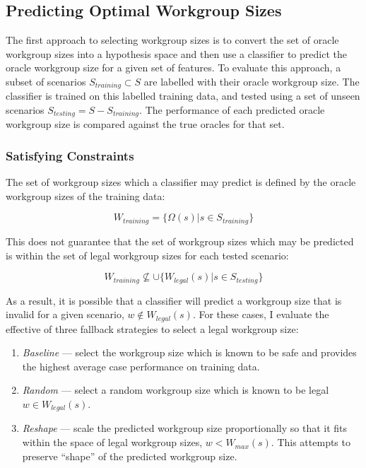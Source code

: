 \subsection{Predicting Optimal Workgroup Sizes}

The first approach to selecting workgroup sizes is to convert the set
of oracle workgroup sizes into a hypothesis space and then use a
classifier to predict the oracle workgroup size for a given set of
features. To evaluate this approach, a subset of scenarios
$S_{training} \subset S$ are labelled with their oracle workgroup
size. The classifier is trained on this labelled training data, and
tested using a set of unseen scenarios
$S_{testing} = S - S_{training}$. The performance of each predicted
oracle workgroup size is compared against the true oracles for that
set.


\subsubsection{Satisfying Constraints}

The set of workgroup sizes which a classifier may predict is defined
by the oracle workgroup sizes of the training data:

\begin{equation}
W_{training} = \{ \Omega(s) | s \in S_{training} \}
\end{equation}

This does not guarantee that the set of workgroup sizes which may be
predicted is within the set of legal workgroup sizes for each tested
scenario:

\begin{equation}
W_{training} \nsubseteq \cup \{ W_{legal}(s) | s \in S_{testing} \}
\end{equation}


As a result, it is possible that a classifier will predict a workgroup
size that is invalid for a given scenario, $w \not\in W_{legal}(s)$.
For these cases, I evaluate the effective of three fallback strategies
to select a legal workgroup size:

\begin{enumerate}
\item \emph{Baseline} --- select the workgroup size which is known to
  be safe and provides the highest average case performance on
  training data.
\item \emph{Random} --- select a random workgroup size which is known
  to be legal $w \in W_{legal}(s)$.
\item \emph{Reshape} --- scale the predicted workgroup size
  proportionally so that it fits within the space of legal workgroup
  sizes, $w < W_{max}(s)$. This attempts to preserve ``shape'' of the
  predicted workgroup size.
\end{enumerate}

